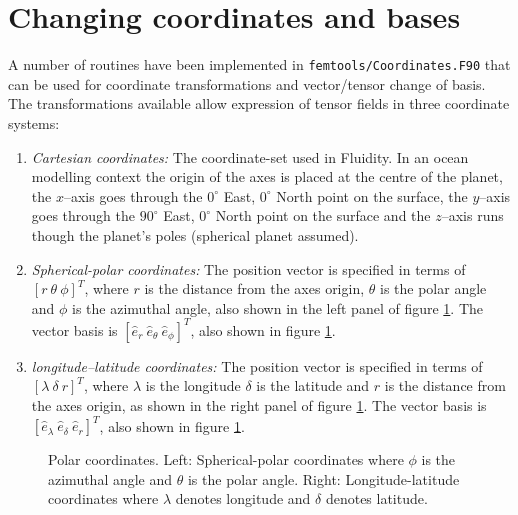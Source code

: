 \documentclass[a4paper, 11pt]{book}
\begin{document}
\section{Changing coordinates and bases}
A number of routines have been implemented in \lstinline{femtools/Coordinates.F90}
that can be used for coordinate transformations and vector/tensor change of basis.
The transformations available allow expression of tensor fields in three coordinate
systems:
\begin{enumerate}
\item{\emph{Cartesian coordinates:}} The coordinate-set used in Fluidity. In an
ocean modelling context the origin of the axes is placed at the centre of the planet,
the $x$--axis goes through the $0^\circ$ East, $0^\circ$ North point on the surface,
the $y$--axis goes through the $90^\circ$ East, $0^\circ$ North point on the surface
and the $z$--axis runs though the planet's poles (spherical planet assumed).
\item{\emph{Spherical-polar coordinates:}} The position vector is specified in terms
of $\left[ r \ \theta \ \phi \right]^T$, where $r$ is the distance from the axes origin,
$\theta$ is the polar angle and $\phi$ is the azimuthal angle, also shown in the left
panel of figure \ref{fig:polarCoordinates}. The vector basis is $\left[ \hat{e}_r \ \hat{e}_\theta \ \hat{e}_\phi \right]^T$, also shown in figure \ref{fig:polarCoordinates}.
\item{\emph{longitude--latitude coordinates:}} The position vector is specified in terms of $\left[ \lambda \ \delta \ r \right]^T$, where $\lambda$ is the longitude $\delta$ is the latitude and $r$ is the distance from the axes origin, as shown in the right panel of figure \ref{fig:polarCoordinates}. The vector basis is $\left[ \hat{e}_\lambda \ \hat{e}_\delta \ \hat{e}_r \right]^T$, also shown in figure \ref{fig:polarCoordinates}.
\end{enumerate}
\begin{figure}[ht]
  \centering
  \caption{Polar coordinates. Left: Spherical-polar coordinates where $\phi$ is the azimuthal angle and $\theta$ is the polar angle. Right: Longitude-latitude coordinates where $\lambda$ denotes longitude and $\delta$ denotes latitude.}
  \label{fig:polarCoordinates}
\end{figure}
\end{document}
